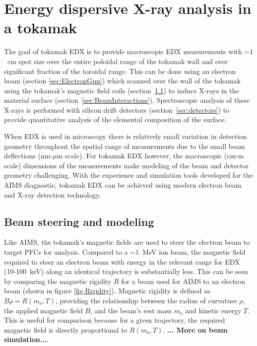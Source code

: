 \documentclass[12pt,letterpaper,final]{article}
\begin{document}
\section{Energy dispersive X-ray analysis in a tokamak}

The goal of tokamak EDX is to provide macroscopic EDX measurements with $\sim1$~cm spot size over the entire poloidal range of the tokamak wall and over significant fraction of the toroidal range. This can be done using an electron beam (section \ref{sec:ElectronGun}) which scanned over the wall of the tokamak using the tokamak's magnetic field coils (section~\ref{sec:BeamSteering}) to induce X-rays in the material surface (section~\ref{sec:BeamInteractions}). Spectroscopic analysis of these X-rays is performed with silicon drift detectors (section~\ref{sec:detectors}) to provide quantitative analysis of the elemental composition of the surface. 

When EDX is used in microscopy there is relatively small variation in detection geometry throughout the spatial range of measurements due to the small beam deflections (nm-$\mu$m scale). For tokamak EDX however, the macroscopic (cm-m scale) dimensions of the measurements make modeling of the beam and detector geometry challenging. With the experience and simulation tools developed for the AIMS diagnostic, tokamak EDX can be achieved using modern electron beam and X-ray detection technology.

\subsection{Beam steering and modeling}
\label{sec:BeamSteering}
Like AIMS, the tokamak's magnetic fields are used to steer the electron beam to target PFCs for analysis. Compared to a $\sim 1$~MeV ion beam, the magnetic field required to steer an electron beam with energy in the relevant range for EDX (10-100~keV) along an identical trajectory is substantially less. This can be seen by comparing the magnetic rigidity $R$ for a beam used for AIMS to an electron beam (shown in figure \ref{fig:Rigidity}). Magnetic rigidity is defined as $B\rho = R(m_o,T)$, providing the relationship between the radius of curvature $\rho$, the applied magnetic field $B$, and the beam's rest mass $m_o$ and kinetic energy $T$. This is useful for comparison because for a given trajectory, the required magnetic field is directly proportional to $R(m_o,T)$. \textbf{... More on beam simulation...}.
\end{document}
